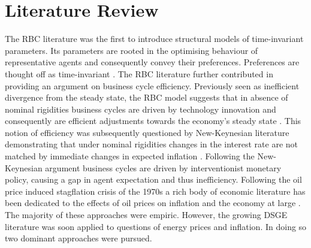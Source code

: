 \documentclass[12pt,a4paper,english]{article} %
\let\oldsection\section
\renewcommand\section{\clearpage\oldsection}
\begin{document}
	\section{Literature Review}
	The RBC literature was the first to introduce structural models of time-invariant parameters. Its parameters are rooted in the optimising behaviour of representative agents and consequently convey their preferences. Preferences are thought off as time-invariant \cite{prescott_theory_1986}. The RBC literature further contributed in providing an argument on business cycle efficiency. Previously seen as inefficient divergence from the steady state, the RBC model suggests that in absence of nominal rigidities business cycles are driven by technology innovation and consequently are efficient adjustments towards the economy's steady state \cite{christiano_current_1992}. This notion of efficiency was subsequently questioned by New-Keynesian literature demonstrating that under nominal rigidities changes in the interest rate are not matched by immediate changes in expected inflation \cite{gali_monetary_2008}. Following the New-Keynesian argument business cycles are driven by interventionist monetary policy, causing a gap in agent expectation and thus inefficiency\cite{gali_monetary_2008}. Following the oil price induced stagflation crisis of the 1970s a rich body of economic literature has been dedicated to the effects of oil prices on inflation and the economy at large \cite{barsky_oil_2002, bernanke_systematic_1997}. The majority of these approaches were empiric. However, the growing DSGE literature was soon applied to questions of energy prices and inflation. In doing so two dominant approaches were pursued.
	
\end{document}
